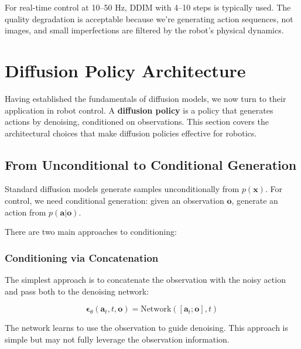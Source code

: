 For real-time control at 10--50 Hz, DDIM with 4--10 steps is typically used. The quality degradation is acceptable because we're generating action sequences, not images, and small imperfections are filtered by the robot's physical dynamics.

\section{Diffusion Policy Architecture}
\label{sec:diffusion_policy_architecture}

Having established the fundamentals of diffusion models, we now turn to their application in robot control. A \textbf{diffusion policy} is a policy that generates actions by denoising, conditioned on observations. This section covers the architectural choices that make diffusion policies effective for robotics.

\subsection{From Unconditional to Conditional Generation}
\label{subsec:conditional_generation}

Standard diffusion models generate samples unconditionally from $p(\mathbf{x})$. For control, we need conditional generation: given an observation $\mathbf{o}$, generate an action from $p(\mathbf{a} | \mathbf{o})$.

There are two main approaches to conditioning:

\subsubsection{Conditioning via Concatenation}

The simplest approach is to concatenate the observation with the noisy action and pass both to the denoising network:

\begin{equation}
\boldsymbol{\epsilon}_\theta(\mathbf{a}_t, t, \mathbf{o}) = \text{Network}([\mathbf{a}_t; \mathbf{o}], t)
\label{eq:concat_conditioning}
\end{equation}

The network learns to use the observation to guide denoising. This approach is simple but may not fully leverage the observation information.

